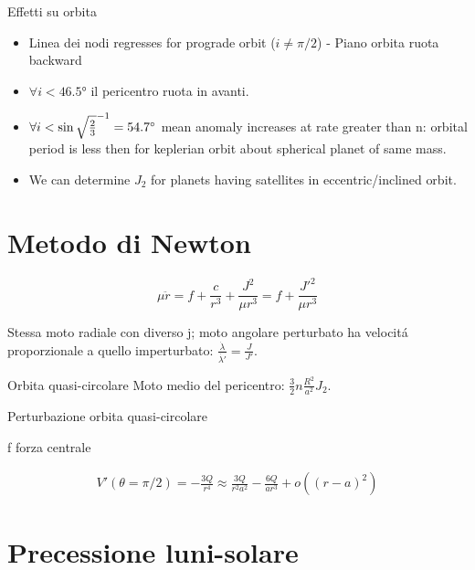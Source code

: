 \begin{frame}{Effetti su orbita}

\begin{itemize}
\item Linea dei nodi regresses for prograde orbit ($i\neq\pi/2$) - Piano orbita ruota backward

\item $\forall i<\ang{46.5}$ il pericentro ruota in avanti.

\item $\forall i<\sin{\sqrt{\frac{2}{3}}}^{-1}=\ang{54.7}$ mean anomaly increases at rate greater than n: orbital period is less then for keplerian orbit about spherical planet of same mass.

\item We can determine $J_2$ for planets having satellites in eccentric/inclined orbit.

\end{itemize}

\end{frame}

\section{Metodo di Newton}


\begin{equation*}
\mu\ddot{r}=f+\frac{c}{r^3}+\frac{J^2}{\mu r^3}=f+\frac{J'^2}{\mu r^3}
\end{equation*}


Stessa moto radiale con diverso j; moto angolare perturbato ha velocit\'a proporzionale a quello imperturbato: $\frac{\dot{\lambda}}{\dot{\lambda'}}=\frac{J}{J'}$.

\begin{block}{Orbita quasi-circolare}
Moto medio del pericentro: $\frac{3}{2}n\frac{R^2}{a^2}J_2$.
\end{block}

\begin{wordonframe}{Perturbazione orbita quasi-circolare}

f forza centrale

\begin{align*}
V'(\theta=\pi/2)=-\frac{3Q}{r^4}\approx\frac{3Q}{r^2a^2}-\frac{6Q}{ar^3}+o((r-a)^2)
\end{align*}

\end{wordonframe}

\section{Precessione luni-solare}

